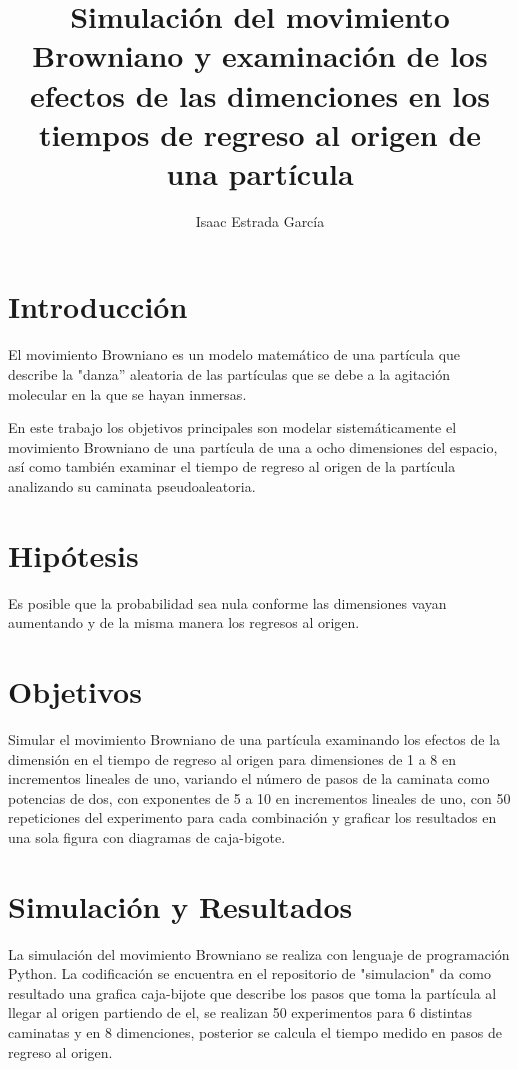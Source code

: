 \documentclass{article}
\title{Simulaci\'{o}n del movimiento Browniano y examinaci\'{o}n de los efectos de las dimenciones en los tiempos de regreso al origen de una part\'{i}cula}
\author{Isaac Estrada Garc\'{i}a }
\begin{document}
\maketitle

\section{Introducci\'{o}n}
El movimiento Browniano es un modelo matem\'{a}tico de una part\'{i}cula que describe la "danza'' aleatoria de las part\'{i}culas que se debe\citep{mov} a la agitaci\'{o}n molecular en la que se hayan inmersas.

En este trabajo los objetivos principales son modelar sistem\'{a}ticamente el movimiento Browniano de una part\'{i}cula de una a ocho dimensiones del espacio, as\'{i} como tambi\'{e}n examinar el tiempo de regreso al origen de la part\'{i}cula analizando su caminata pseudoaleatoria.

\section{Hip\'{o}tesis}
Es posible que la probabilidad sea nula conforme las dimensiones vayan aumentando y de la misma manera los regresos al origen.

\section{Objetivos}
Simular el movimiento Browniano\citep{elis} de una part\'{i}cula examinando los efectos de la dimensi\'{o}n en el tiempo de regreso al origen para dimensiones de 1 a 8 en incrementos lineales de uno, variando el n\'{u}mero de pasos de la caminata como potencias de dos, con exponentes de 5 a 10 en incrementos lineales de uno, con 50 repeticiones del experimento para cada combinaci\'{o}n y graficar los resultados en una sola figura con diagramas de caja-bigote. 

\section{Simulaci\'{o}n y Resultados}

La simulaci\'{o}n del movimiento Browniano se realiza con lenguaje de programaci\'{o}n Python. La codificaci\'{o}n se encuentra en el repositorio de "simulacion" da como resultado una grafica caja-bijote que describe los pasos que toma la part\'{i}cula al llegar al origen partiendo de el, se realizan 50 experimentos para 6 distintas caminatas y en 8 dimenciones, posterior se calcula el tiempo medido en pasos de regreso al origen.
\end{document}
